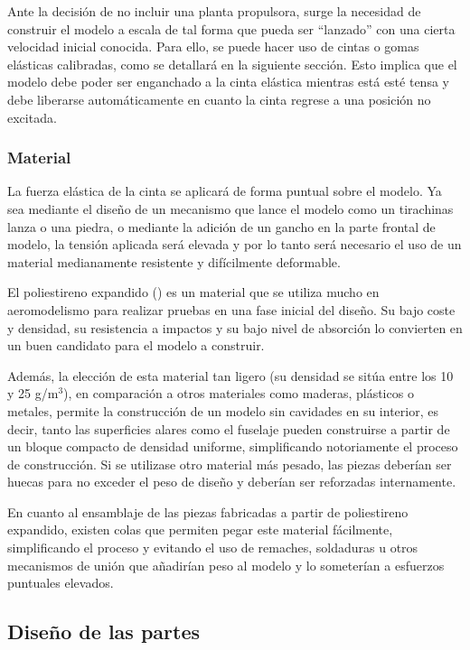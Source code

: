 Ante la decisión de no incluir una planta propulsora, surge la necesidad de construir el modelo a escala de tal forma que pueda ser “lanzado” con una cierta velocidad inicial conocida. Para ello, se puede hacer uso de cintas o gomas elásticas calibradas, como se detallará en la siguiente sección. Esto implica que el modelo debe poder ser enganchado a la cinta elástica mientras está esté tensa y debe liberarse automáticamente en cuanto la cinta regrese a una posición no excitada.

\subsubsection{Material}
\label{sec:building:conception:material}

La fuerza elástica de la cinta se aplicará de forma puntual sobre el modelo. Ya sea mediante el diseño de un mecanismo que lance el modelo como un tirachinas lanza o una piedra, o mediante la adición de un gancho en la parte frontal de modelo, la tensión aplicada será elevada y por lo tanto será necesario el uso de un material medianamente resistente y difícilmente deformable.

El poliestireno expandido () es un material que se utiliza mucho en aeromodelismo para realizar pruebas en una fase inicial del diseño. Su bajo coste y densidad, su resistencia a impactos y su bajo nivel de absorción lo convierten en un buen candidato para el modelo a construir.

Además, la elección de esta material tan ligero (su densidad se sitúa entre los 10 y 25 g/m$^3$)\cite{ref:poliestirenoexpandido}, en comparación a otros materiales como maderas, plásticos o metales, permite la construcción de un modelo sin cavidades en su interior, es decir, tanto las superficies alares como el fuselaje pueden construirse a partir de un bloque compacto de densidad uniforme, simplificando notoriamente el proceso de construcción. Si se utilizase otro material más pesado, las piezas deberían ser huecas para no exceder el peso de diseño y deberían ser reforzadas internamente.

En cuanto al ensamblaje de las piezas fabricadas a partir de poliestireno expandido, existen colas que permiten pegar este material fácilmente, simplificando el proceso y evitando el uso de remaches, soldaduras u otros mecanismos de unión que añadirían peso al modelo y lo someterían a esfuerzos puntuales elevados.


\subsection{Diseño de las partes}
\label{sec:building:parts}


